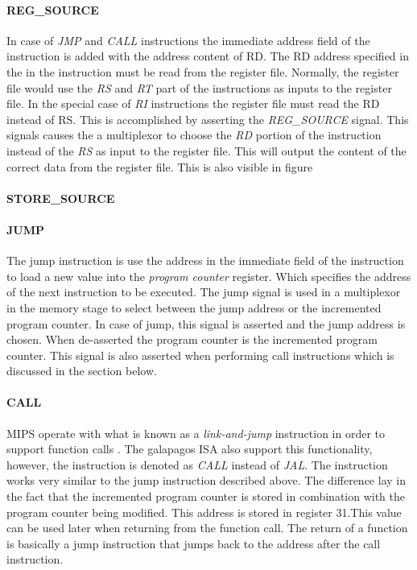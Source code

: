 \paragraph{REG\_SOURCE}
In case of \emph{JMP} and \emph{CALL} instructions the immediate address field of the instruction is added with the address content of RD. The RD address specified in the in the instruction must be read from the register file. Normally, the register file would use the \emph{RS} and \emph{RT} part of the instructions as inputs to the register file. In the special case of \emph{RI} instructions the register file must read the RD instead of RS. This is accomplished by asserting the \emph{REG\_SOURCE} signal. This signals causes the a multiplexor to choose the \emph{RD} portion of the instruction instead of the \emph{RS} as input to the register file. This will output the content of the correct data from the register file. This is also visible in figure    


\paragraph{STORE\_SOURCE}






\paragraph{JUMP}
The jump instruction is use the address in the immediate field of the instruction to load a new value into the \emph{program counter} register. Which specifies the address of the next instruction to be executed. The jump signal is used in a multiplexor in the memory stage to select between the jump address or the incremented program counter. In case of jump, this signal is asserted and the jump address is chosen. When de-asserted the program counter is the incremented program counter. This signal is also asserted when performing call instructions which is discussed in the section below.   

\paragraph{CALL}
MIPS operate with what is known as a \emph{link-and-jump} instruction in order to support function calls \cn. The galapagos ISA also support this functionality, however, the instruction is denoted as \emph{CALL} instead of \emph{JAL}. The instruction works very similar to the jump instruction described above. The difference lay in the fact that the incremented program counter is stored in combination with the program counter being modified. This address is stored in register 31.This value can be used later when returning from the function call. The return of a function is basically a jump instruction that jumps back to the address after the call instruction.

